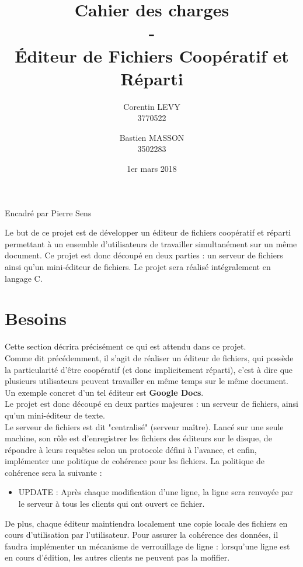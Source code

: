 \documentclass[12pt]{article}
\title{Cahier des charges\\-\\\'Editeur de Fichiers Coopératif et Réparti}
\author{Corentin LEVY\\3770522\\
		\and
		Bastien MASSON\\3502283}
\date{1er mars 2018}
\begin{document}
\begin{titlepage}

\maketitle
\begin{center}
Encadré par Pierre Sens
\end{center}

Le but de ce projet est de développer un éditeur de fichiers coopératif et réparti permettant à un ensemble d'utilisateurs de travailler simultanément sur un même document. Ce projet est donc découpé en deux parties : un serveur de fichiers ainsi qu'un mini-éditeur de fichiers. Le projet sera réalisé intégralement en langage C.

\end{titlepage}
\tableofcontents
\newpage
\section{Besoins}
Cette section décrira précisément ce qui est attendu dans ce projet.\\

Comme dit précédemment, il s'agit de réaliser un éditeur de fichiers, qui possède la particularité d'être coopératif (et donc implicitement réparti), c'est à dire que plusieurs utilisateurs peuvent travailler en même temps sur le même document. Un exemple concret d'un tel éditeur est \textbf{Google Docs}.\\

Le projet est donc découpé en deux parties majeures : un serveur de fichiers, ainsi qu'un mini-éditeur de texte.\\

Le serveur de fichiers est dit "centralisé" (serveur maître). Lancé sur une seule machine, son rôle est d'enregistrer les fichiers des éditeurs sur le disque, de répondre à leurs requêtes selon un protocole défini à l'avance, et enfin, implémenter une politique de cohérence pour les fichiers.
La politique de cohérence sera la suivante :\\
\begin{itemize}
\item UPDATE : Après chaque modification d'une ligne, la ligne sera renvoyée par le serveur à tous les clients qui ont ouvert ce fichier.\\
\end{itemize}

De plus, chaque éditeur maintiendra localement une copie locale des fichiers en cours d'utilisation par l'utilisateur. Pour assurer la cohérence des données, il faudra implémenter un mécanisme de verrouillage de ligne : lorsqu'une ligne est en cours d'édition, les autres clients ne peuvent pas la mofifier.\\
\end{document}
